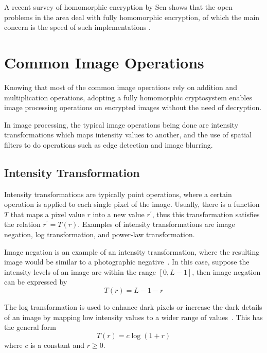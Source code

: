 A recent survey of homomorphic encryption by Sen shows that the open problems in the area deal with fully homomorphic encryption, of which the main concern is the speed of such implementations \cite{sen_homomorphic_2013}.


\section{Common Image Operations}

Knowing that most of the common image operations rely on addition and multiplication operations, adopting a fully homomorphic cryptosystem enables image processing operations on encrypted images without the need of decryption.

In image processing, the typical image operations being done are intensity transformations which maps intensity values to another, and the use of spatial filters to do operations such as edge detection and image blurring.

\subsection{Intensity Transformation}
Intensity transformations are typically point operations, where a certain operation is applied to each single pixel of the image. Usually, there is a function $T$ that maps a pixel value $r$ into a new value $r^\prime$, thus this transformation satisfies the relation $r^\prime = T\left(r\right)$. Examples of intensity transformations are image negation, log transformation, and power-law transformation.

Image negation is an example of an intensity transformation, where the resulting image would be similar to a photographic negative~\cite{gonzalez_digital_2008}. In this case, suppose the intensity levels of an image are within the range $\left[0, L-1\right]$, then image negation can be expressed by
\begin{equation}
    T\left(r\right) = L-1-r
\end{equation}

The log transformation is used to enhance dark pixels or increase the dark details of an image by mapping low intensity values to a wider range of values~\cite{gonzalez_digital_2008}. This has the general form
\begin{equation}
    T\left(r\right) = c \log\left(1 + r\right)
\end{equation}
where $c$ is a constant and $r \ge 0$.

